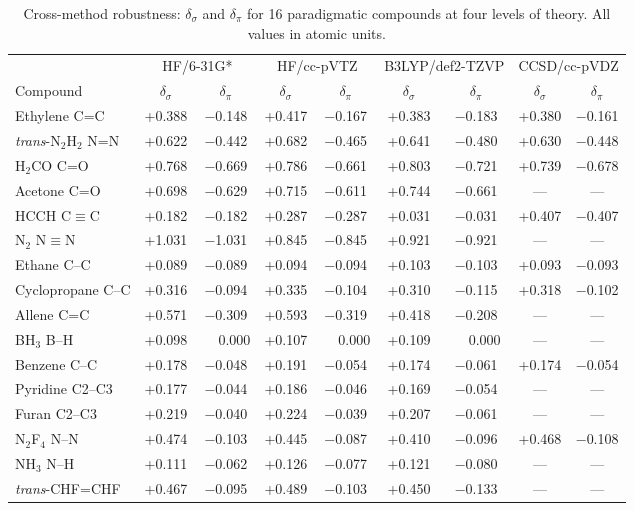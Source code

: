 \documentclass[11pt,a4paper]{article}
\begin{document}
\begin{table}[h!]
\centering
\caption{Cross-method robustness: $\delta_\sigma$ and $\delta_\pi$
for 16 paradigmatic compounds at four levels of theory. All values in atomic units.}
\label{tab:SI_methods}
\small
\begin{tabular}{lcccccccc}
\toprule
& \multicolumn{2}{c}{HF/6-31G*} & \multicolumn{2}{c}{HF/cc-pVTZ} & \multicolumn{2}{c}{B3LYP/def2-TZVP} & \multicolumn{2}{c}{CCSD/cc-pVDZ} \\
\cmidrule(lr){2-3}\cmidrule(lr){4-5}\cmidrule(lr){6-7}\cmidrule(lr){8-9}
Compound & $\delta_\sigma$ & $\delta_\pi$ & $\delta_\sigma$ & $\delta_\pi$ & $\delta_\sigma$ & $\delta_\pi$ & $\delta_\sigma$ & $\delta_\pi$ \\
\midrule
Ethylene C=C            & +0.388 & $-$0.148 & +0.417 & $-$0.167 & +0.383 & $-$0.183 & +0.380 & $-$0.161 \\
\textit{trans}-N$_2$H$_2$ N=N & +0.622 & $-$0.442 & +0.682 & $-$0.465 & +0.641 & $-$0.480 & +0.630 & $-$0.448 \\
H$_2$CO C=O             & +0.768 & $-$0.669 & +0.786 & $-$0.661 & +0.803 & $-$0.721 & +0.739 & $-$0.678 \\
Acetone C=O             & +0.698 & $-$0.629 & +0.715 & $-$0.611 & +0.744 & $-$0.661 & --- & --- \\
HCCH C$\equiv$C         & +0.182 & $-$0.182 & +0.287 & $-$0.287 & +0.031 & $-$0.031 & +0.407 & $-$0.407 \\
N$_2$ N$\equiv$N        & +1.031 & $-$1.031 & +0.845 & $-$0.845 & +0.921 & $-$0.921 & --- & --- \\
Ethane C--C             & +0.089 & $-$0.089 & +0.094 & $-$0.094 & +0.103 & $-$0.103 & +0.093 & $-$0.093 \\
Cyclopropane C--C       & +0.316 & $-$0.094 & +0.335 & $-$0.104 & +0.310 & $-$0.115 & +0.318 & $-$0.102 \\
Allene C=C              & +0.571 & $-$0.309 & +0.593 & $-$0.319 & +0.418 & $-$0.208 & --- & --- \\
BH$_3$ B--H             & +0.098 & $\phantom{-}$0.000 & +0.107 & $\phantom{-}$0.000 & +0.109 & $\phantom{-}$0.000 & --- & --- \\
Benzene C--C            & +0.178 & $-$0.048 & +0.191 & $-$0.054 & +0.174 & $-$0.061 & +0.174 & $-$0.054 \\
Pyridine C2--C3         & +0.177 & $-$0.044 & +0.186 & $-$0.046 & +0.169 & $-$0.054 & --- & --- \\
Furan C2--C3            & +0.219 & $-$0.040 & +0.224 & $-$0.039 & +0.207 & $-$0.061 & --- & --- \\
N$_2$F$_4$ N--N         & +0.474 & $-$0.103 & +0.445 & $-$0.087 & +0.410 & $-$0.096 & +0.468 & $-$0.108 \\
NH$_3$ N--H             & +0.111 & $-$0.062 & +0.126 & $-$0.077 & +0.121 & $-$0.080 & --- & --- \\
\textit{trans}-CHF=CHF  & +0.467 & $-$0.095 & +0.489 & $-$0.103 & +0.450 & $-$0.133 & --- & --- \\
\bottomrule
\end{tabular}
\end{table}
\end{document}
